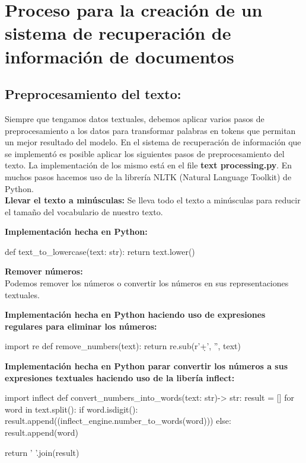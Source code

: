 \documentclass{llncs}
\begin{document}
\chapter*{Proceso para la creación de un sistema de recuperación de información de documentos}

\section{Preprocesamiento del texto:}

Siempre que tengamos datos textuales, debemos aplicar varios pasos de preprocesamiento a los 
datos para transformar palabras en tokens que permitan un mejor resultado del modelo.
En el sistema de recuperación de información que se implementó es posible aplicar 
los siguientes pasos de preprocesamiento del texto. La implementación de los mismo está en 
el file \textbf{text processing.py}. En muchos pasos hacemos uso de la librería NLTK (Natural Language Toolkit)
de Python.
\\

\noindent
\textbf{Llevar el texto a minúsculas:}
Se lleva todo el texto a minúsculas para reducir el tama\~{n}o del vocabulario de nuestro texto.

\noindent
\textbf{Implementación hecha en Python:}
\begin{python}
    def text_to_lowercase(text: str):
        return text.lower()
\end{python}

\noindent
\textbf{Remover números:}\\
Podemos remover los números o convertir los números en sus representaciones textuales. 

\noindent
\textbf{Implementación hecha en Python haciendo uso de expresiones regulares para eliminar los números:}
\begin{python}
    import re
    def remove_numbers(text):
        return re.sub(r'\d+', '', text)
\end{python}

\noindent
\textbf{Implementación hecha en Python parar convertir los números a sus expresiones textuales haciendo uso de la libería inflect:}
\begin{python}
    import inflect
    def convert_numbers_into_words(text: str)-> str:
        result = []
        for word in text.split(): 
            if word.isdigit(): 
                result.append((inflect_engine.number_to_words(word)))
            else:
                result.append(word)

        return ' '.join(result)
\end{python}
\end{document}
